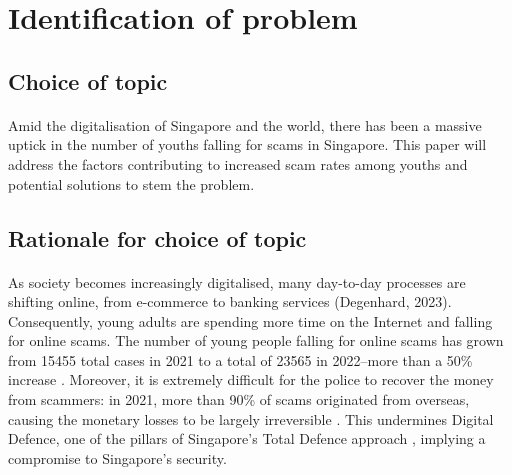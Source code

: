 \message{ !name(written-report.tex)}\documentclass[a4paper]{article}
\begin{document}
\newpage


\begin{abstract}
  \noindent
  \ldots?
\end{abstract}

\newpage


\tableofcontents

\newpage


\section{Identification of problem}
\subsection{Choice of topic}
\paragraph{} Amid the digitalisation of Singapore and the world, there has been
a massive uptick in the number of youths falling for scams in Singapore. This
paper will address the factors contributing to increased scam rates among youths
and potential solutions to stem the problem.

\subsection{Rationale for choice of topic}
\paragraph{} As society becomes increasingly digitalised, many day-to-day
processes are shifting online, from e-commerce \parencite{ITA.2022} to banking
services (Degenhard, 2023). Consequently, young adults are spending more time on
the Internet and falling for online scams. The number of young people falling
for online scams has grown from 15455 total cases in 2021 to a total of 23565 in
2022–more than a 50\% increase \parencite{Tham.2023}. Moreover, it is extremely
difficult for the police to recover the money from scammers: in 2021, more than
90\% of scams originated from overseas, causing the monetary losses to be
largely irreversible \parencite{Begum.2022}. This undermines Digital Defence,
one of the pillars of Singapore’s Total Defence approach \parencite{SCDF.2023},
implying a compromise to Singapore’s security.
\end{document}
